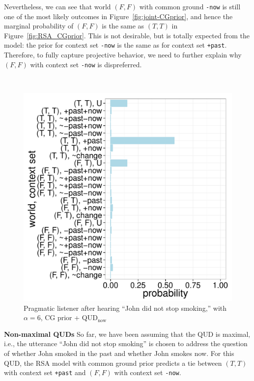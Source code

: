 Nevertheless, we can see that world $(F, F)$ with common ground \verb=-now= 
 is still one of the most likely outcomes in Figure~\ref{fig:joint-CGprior}, and
 hence the marginal probability of $(F, F)$ is the same as $(T, T)$ in Figure~\ref{fig:RSA_CGprior}.
This is not desirable, but is totally expected from the model: 
 the prior for context set \verb=-now= is the same as for context set \verb=+past=. 
Therefore, to fully capture projective behavior, we need to further
 explain why $(F, F)$ with context set \verb=-now= is dispreferred.


\ 

\begin{figure}
 \includegraphics[scale=0.4]{figs/joint_CGprior_QUDnow.pdf}
 \caption{Pragmatic listener after hearing ``John did not stop smoking,'' with $\alpha=6$, CG prior + QUD$_\text{now}$\label{fig:joint-QUDnow}}
\vspace{-3ex}
\end{figure}

\noindent\textbf{Non-maximal QUDs} \quad
So far, we have been assuming that the QUD is maximal, i.e., the utterance 
 ``John did not stop smoking'' is chosen to address the question of
 whether John smoked in the past and whether John smokes now.
For this QUD, the RSA model with common ground prior predicts a tie between 
 $(T, T)$ with context set \verb=+past= and
 $(F, F)$ with context set \verb=-now=.
 
